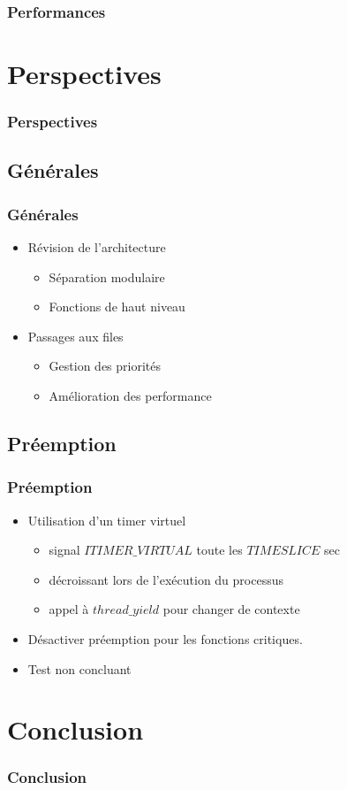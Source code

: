\documentclass{beamer}
\begin{document}
\begin{frame}
  \frametitle{Performances}
\end{frame}

\section{Perspectives}

\begin{frame}
  \frametitle{Perspectives}
\end{frame}

\subsection{Générales}

\begin{frame}
	\frametitle{Générales}
	
	\begin{itemize}
		\item Révision de l'architecture
		\begin{itemize}
			\item Séparation modulaire
			\item Fonctions de haut niveau
		\end{itemize}
		\item Passages aux files
		\begin{itemize}
			\item Gestion des priorités
			\item Amélioration des performance
		\end{itemize}
	
	\end{itemize}
\end{frame}

\subsection{Préemption}

\begin{frame}
  \frametitle{Préemption}
  \begin{itemize}
    \item Utilisation d'un timer virtuel
      \begin{itemize}
      \item signal $ITIMER\_VIRTUAL$ toute les $TIMESLICE$ sec
      \item décroissant lors de l'exécution du processus
      \item appel à $thread\_yield$ pour changer de contexte
      \end{itemize}
    \item Désactiver préemption pour les fonctions critiques.
    \item Test non concluant
  \end{itemize}
\end{frame}

\section{Conclusion}

\begin{frame}
  \frametitle{Conclusion}
\end{frame}


 
\end{document}
